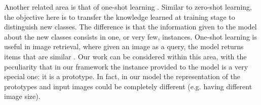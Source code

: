 \documentclass{bmvc2k}
\begin{document}
Another related area is that of one-shot learning
\cite{bart2005cross,lake2011one,fei2006one}. Similar to zero-shot learning, the objective here is
to transfer the knowledge learned at training stage to distinguish new classes.
The difference is that the information given to the model about the new classes
consists in one, or very few, instances.
One-shot learning is useful in image retrieval, where given an image as a query,
the model returns items that are similar \cite{seanBell2015}. Our work can be considered within this area, with the peculiarity that in
our framework the instance provided to the model is a very special one: it is a prototype. 
In fact, in our model the representation of the prototypes and input images could
be completely different (e.g. having different image size).

\end{document}
